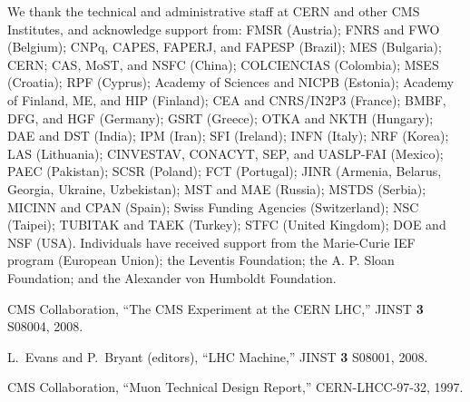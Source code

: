 \begin{acknowledgments}
We thank the technical and administrative staff at CERN and other CMS
Institutes, and acknowledge support from: FMSR (Austria); FNRS and FWO
(Belgium); CNPq, CAPES, FAPERJ, and FAPESP (Brazil); MES (Bulgaria);
CERN; CAS, MoST, and NSFC (China); COLCIENCIAS (Colombia); MSES
(Croatia); RPF (Cyprus); Academy of Sciences and NICPB (Estonia);
Academy of Finland, ME, and HIP (Finland); CEA and CNRS/IN2P3
(France); BMBF, DFG, and HGF (Germany); GSRT (Greece); OTKA and NKTH
(Hungary); DAE and DST (India); IPM (Iran); SFI (Ireland); INFN
(Italy); NRF (Korea); LAS (Lithuania); CINVESTAV, CONACYT, SEP, and
UASLP-FAI (Mexico); PAEC (Pakistan); SCSR (Poland); FCT (Portugal);
JINR (Armenia, Belarus, Georgia, Ukraine, Uzbekistan); MST and MAE
(Russia); MSTDS (Serbia); MICINN and CPAN (Spain); Swiss Funding
Agencies (Switzerland); NSC (Taipei); TUBITAK and TAEK (Turkey); STFC
(United Kingdom); DOE and NSF (USA). Individuals have received support
from the Marie-Curie IEF program (European Union); the Leventis
Foundation; the A. P. Sloan Foundation; and the Alexander von Humboldt
Foundation.
\end{acknowledgments}

\bigskip %
%
\begin{thebibliography}{9}   %

 CMS Collaboration, ``The CMS Experiment at the CERN LHC,'' JINST {\bf 3} S08004, 2008.

 L.~Evans and P.~Bryant (editors), ``LHC Machine,'' JINST {\bf 3} S08001, 2008.

 CMS Collaboration, ``Muon Technical Design Report,'' CERN-LHCC-97-32, 1997.

\end{thebibliography}


